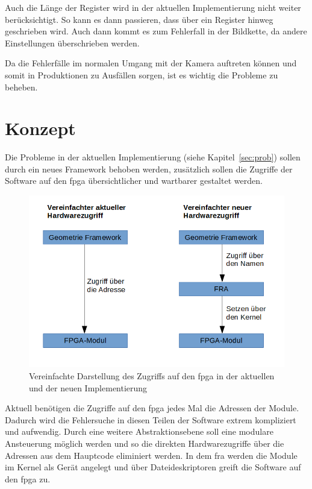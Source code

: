 Auch die Länge der Register wird in der aktuellen Implementierung nicht weiter berücksichtigt. So kann es dann passieren, dass über ein Register hinweg geschrieben wird. Auch dann kommt es zum Fehlerfall in der Bildkette, da andere Einstellungen überschrieben werden. 

Da die Fehlerfälle im normalen Umgang mit der Kamera auftreten können und somit in Produktionen zu Ausfällen sorgen, ist es wichtig die Probleme zu beheben.

\section{Konzept}
Die Probleme in der aktuellen Implementierung (siehe Kapitel~\ref{sec:prob}) sollen durch ein neues Framework behoben werden, zusätzlich sollen die Zugriffe der Software auf den \ac{fpga} übersichtlicher und wartbarer gestaltet werden.

\begin{figure}[!hbtp]
	\centering
	\includegraphics[width = 0.9\linewidth]{pictures/2019-11-17_ImplementierungNewvsOld.png}
	\smallskip
	\caption{Vereinfachte Darstellung des Zugriffs auf den \ac{fpga} in der aktuellen und der neuen Implementierung}
	\label{fig:newvsold}
\end{figure} 



Aktuell benötigen die Zugriffe auf den \ac{fpga} jedes Mal die Adressen der Module. Dadurch wird die Fehlersuche in diesen Teilen der Software extrem kompliziert und aufwendig. Durch eine weitere Abstraktionsebene soll eine modulare Ansteuerung möglich werden und so die direkten Hardwarezugriffe über die Adressen aus dem Hauptcode eliminiert werden. In dem \ac{fra} werden die Module im Kernel als Gerät angelegt und über Dateideskriptoren greift die Software auf den \ac{fpga} zu.


